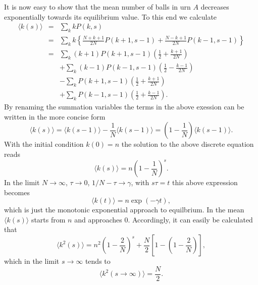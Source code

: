 It is now easy to show that the mean number of balls in urn $A$ decreases
exponentially towards its equilibrium value. To this end we calculate
\begin{eqnarray*}
  \langle k(s) \rangle & = & \sum_k k P(k,s) \\
                       & = & \sum_k  k \left\{
            \frac{N+k+1}{2N} P(k+1,s-1) + \frac{N-k+1}{2N} P(k-1,s-1)
                       \right\}   \\
                       & = & \sum_k (k+1) P(k+1,s-1) 
                           \left( \frac{1}{2} + \frac{k+1}{2N} \right) \\
                       && +  \sum_k (k-1) P(k-1,s-1) 
                           \left( \frac{1}{2} - \frac{k-1}{2N} \right) \\ 
                        && - \sum_k  P(k+1,s-1)
                                \left( \frac{1}{2} + \frac{k+1}{2N} \right) \\
                        && +\sum_k  P(k-1,s-1)
                                \left( \frac{1}{2} + \frac{k-1}{2N} \right) .
\end{eqnarray*}
By renaming the summation variables the terms in the above exession 
can be written in the more concise form
\begin{displaymath}
 \langle k(s) \rangle = \langle k(s-1) \rangle - 
    \frac{1}{N} \langle k(s-1) \rangle = 
    \left( 1 - \frac{1}{N} \right) \langle k(s-1) \rangle.  
\end{displaymath}
With the initial condition $k(0) = n$ the solution to the above discrete
equation reads
\begin{displaymath}
 \langle k(s) \rangle =  n \left( 1 - \frac{1}{N} \right)^s.
\end{displaymath}
In the limit $N \rightarrow \infty$, $\tau \rightarrow 0$, $1/N-\tau
\rightarrow \gamma$, with $s \tau= t$ this above expression becomes
\begin{displaymath}
  \langle k(t) \rangle = n \exp(-\gamma t),
\end{displaymath}
which is just the monotonic exponential approach to equilbrium.
In the mean $\langle k(s) \rangle $ starts from $n$ and approaches 0.
Accordingly, it can easily be calculated that
\begin{displaymath}
  \langle k^2(s) \rangle = n^2 \left( 1 - \frac{2}{N} \right)^s
                        + \frac{N}{2} \left[
                                       1 - \left(1- \frac{2}{N} \right) 
                                        \right],
\end{displaymath}
which in the limit $s \rightarrow \infty$ tends to
\begin{displaymath}
  \langle k^2(s\rightarrow \infty ) \rangle = \frac{N}{2}.
\end{displaymath}

